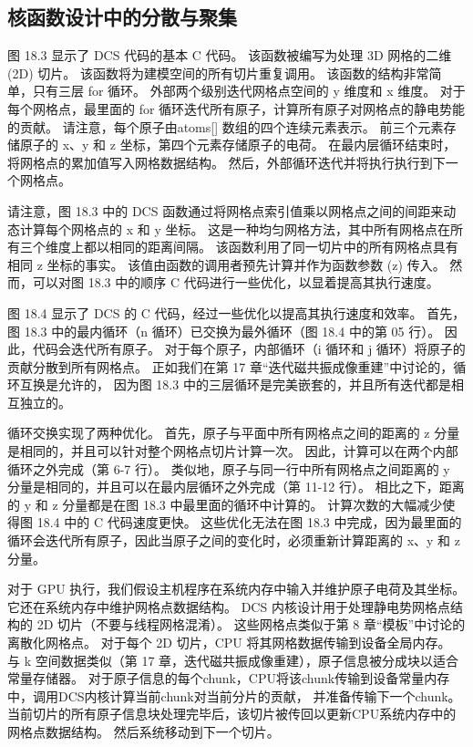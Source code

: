 \subsection{核函数设计中的分散与聚集}
图 18.3 显示了 DCS 代码的基本 C 代码。 该函数被编写为处理 3D 网格的二维 (2D) 切片。 
该函数将为建模空间的所有切片重复调用。 该函数的结构非常简单，只有三层 for 循环。 
外部两个级别迭代网格点空间的 y 维度和 x 维度。 
对于每个网格点，最里面的 for 循环迭代所有原子，计算所有原子对网格点的静电势能的贡献。 
请注意，每个原子由atoms[] 数组的四个连续元素表示。 前三个元素存储原子的 x、y 和 z 坐标，第四个元素存储原子的电荷。 
在最内层循环结束时，将网格点的累加值写入网格数据结构。 然后，外部循环迭代并将执行执行到下一个网格点。

请注意，图 18.3 中的 DCS 函数通过将网格点索引值乘以网格点之间的间距来动态计算每个网格点的 x 和 y 坐标。 
这是一种均匀网格方法，其中所有网格点在所有三个维度上都以相同的距离间隔。 
该函数利用了同一切片中的所有网格点具有相同 z 坐标的事实。 该值由函数的调用者预先计算并作为函数参数 (z) 传入。 
然而，可以对图 18.3 中的顺序 C 代码进行一些优化，以显着提高其执行速度。

图 18.4 显示了 DCS 的 C 代码，经过一些优化以提高其执行速度和效率。 
首先，图 18.3 中的最内循环（n 循环）已交换为最外循环（图 18.4 中的第 05 行）。 因此，代码会迭代所有原子。 
对于每个原子，内部循环（i 循环和 j 循环）将原子的贡献分散到所有网格点。 
正如我们在第 17 章“迭代磁共振成像重建”中讨论的，循环互换是允许的，
因为图 18.3 中的三层循环是完美嵌套的，并且所有迭代都是相互独立的。

循环交换实现了两种优化。 首先，原子与平面中所有网格点之间的距离的 z 分量是相同的，并且可以针对整个网格点切片计算一次。 
因此，计算可以在两个内部循环之外完成（第 6-7 行）。 
类似地，原子与同一行中所有网格点之间距离的 y 分量是相同的，并且可以在最内层循环之外完成（第 11-12 行）。 
相比之下，距离的 y 和 z 分量都是在图 18.3 中最里面的循环中计算的。 计算次数的大幅减少使得图 18.4 中的 C 代码速度更快。 
这些优化无法在图 18.3 中完成，因为最里面的循环会迭代所有原子，因此当原子之间的变化时，必须重新计算距离的 x、y 和 z 分量。

对于 GPU 执行，我们假设主机程序在系统内存中输入并维护原子电荷及其坐标。 它还在系统内存中维护网格点数据结构。 
DCS 内核设计用于处理静电势网格点结构的 2D 切片（不要与线程网格混淆）。 
这些网格点类似于第 8 章“模板”中讨论的离散化网格点。 对于每个 2D 切片，CPU 将其网格数据传输到设备全局内存。 
与 k 空间数据类似（第 17 章，迭代磁共振成像重建），原子信息被分成块以适合常量存储器。 
对于原子信息的每个chunk，CPU将该chunk传输到设备常量内存中，调用DCS内核计算当前chunk对当前分片的贡献，
并准备传输下一个chunk。 当前切片的所有原子信息块处理完毕后，该切片被传回以更新CPU系统内存中的网格点数据结构。 
然后系统移动到下一个切片。

